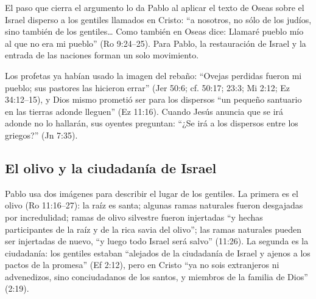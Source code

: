 \documentclass[11pt,letterpaper]{article}
\begin{document}
El paso que cierra el argumento lo da Pablo al aplicar el texto de Oseas sobre el Israel disperso a los gentiles llamados en Cristo: ``a nosotros, no sólo de los judíos, sino también de los gentiles\ldots{} Como también en Oseas dice: Llamaré pueblo mío al que no era mi pueblo'' (Ro 9:24--25). Para Pablo, la restauración de Israel y la entrada de las naciones forman un solo movimiento.

Los profetas ya habían usado la imagen del rebaño: ``Ovejas perdidas fueron mi pueblo; sus pastores las hicieron errar'' (Jer 50:6; cf. 50:17; 23:3; Mi 2:12; Ez 34:12--15), y Dios mismo prometió ser para los dispersos ``un pequeño santuario en las tierras adonde lleguen'' (Ez 11:16). Cuando Jesús anuncia que se irá adonde no lo hallarán, sus oyentes preguntan: ``¿Se irá a los dispersos entre los griegos?'' (Jn 7:35).

\subsection{El olivo y la ciudadanía de Israel}
Pablo usa dos imágenes para describir el lugar de los gentiles. La primera es el olivo (Ro 11:16--27): la raíz es santa; algunas ramas naturales fueron desgajadas por incredulidad; ramas de olivo silvestre fueron injertadas ``y hechas participantes de la raíz y de la rica savia del olivo''; las ramas naturales pueden ser injertadas de nuevo, ``y luego todo Israel será salvo'' (11:26). La segunda es la ciudadanía: los gentiles estaban ``alejados de la ciudadanía de Israel y ajenos a los pactos de la promesa'' (Ef 2:12), pero en Cristo ``ya no sois extranjeros ni advenedizos, sino conciudadanos de los santos, y miembros de la familia de Dios'' (2:19).
\end{document}
